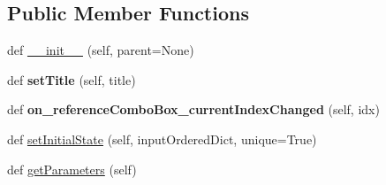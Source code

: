 \subsection*{Public Member Functions}
\begin{DoxyCompactItemize}
\item 
def \mbox{\hyperlink{class_dsg_tools_1_1_custom_widgets_1_1custom_reference_and_layers_parameter_selector_1_1_custom_962aafd2d8f85861a2c944521ade35a6_a72e19c4eda8ce988df1411fd5906624d}{\+\_\+\+\_\+init\+\_\+\+\_\+}} (self, parent=None)
\item 
\mbox{\label{class_dsg_tools_1_1_custom_widgets_1_1custom_reference_and_layers_parameter_selector_1_1_custom_962aafd2d8f85861a2c944521ade35a6_a6fd4ae2ca7bec5b321379f2b9977fe54}} 
def {\bfseries set\+Title} (self, title)
\item 
\mbox{\label{class_dsg_tools_1_1_custom_widgets_1_1custom_reference_and_layers_parameter_selector_1_1_custom_962aafd2d8f85861a2c944521ade35a6_aabdfc0d14b8bccce6b347e10dcd11a20}} 
def {\bfseries on\+\_\+reference\+Combo\+Box\+\_\+current\+Index\+Changed} (self, idx)
\item 
def \mbox{\hyperlink{class_dsg_tools_1_1_custom_widgets_1_1custom_reference_and_layers_parameter_selector_1_1_custom_962aafd2d8f85861a2c944521ade35a6_a8f6443179698e87d12f29b01041c33cd}{set\+Initial\+State}} (self, input\+Ordered\+Dict, unique=True)
\item 
def \mbox{\hyperlink{class_dsg_tools_1_1_custom_widgets_1_1custom_reference_and_layers_parameter_selector_1_1_custom_962aafd2d8f85861a2c944521ade35a6_aabeb5878cda5cb9cb474a1ca63ea5656}{get\+Parameters}} (self)
\end{DoxyCompactItemize}
